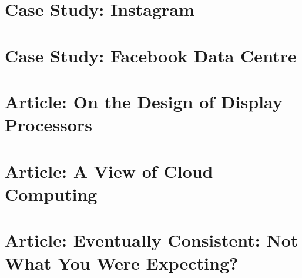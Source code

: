 \documentclass[11pt]{article}
\begin{document}
\section{Case Study: Instagram}

\section{Case Study: Facebook Data Centre}

\section{Article: On the Design of Display Processors}

\section{Article: A View of Cloud Computing}

\section{Article: Eventually Consistent: Not What You Were Expecting?}






%
\end{document}

